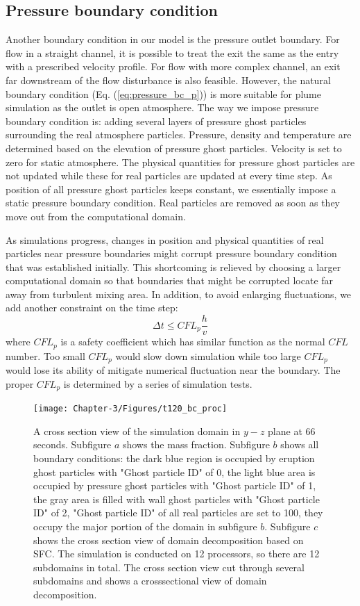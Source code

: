 \subsection{Pressure boundary condition}
Another boundary condition in our model is the pressure outlet boundary. For flow in a straight channel, it is possible to treat the exit the same as the entry with a prescribed velocity profile. For flow with more complex channel, an exit far downstream of the flow disturbance is also feasible. However, the natural boundary condition (Eq. (\ref{eq:pressure_bc_p})) is more suitable for plume simulation as the outlet is open atmosphere. The way we impose pressure boundary condition is: adding several layers of pressure ghost particles surrounding the real atmosphere particles. Pressure, density and temperature are determined based on the elevation of pressure ghost particles. Velocity is set to zero for static atmosphere. The physical quantities for pressure ghost particles are not updated while these for real particles are updated at every time step. As position of all pressure ghost particles keeps constant, we essentially impose a static pressure boundary condition. Real particles are removed as soon as they move out from the computational domain.

As simulations progress, changes in position and physical quantities of real particles near pressure boundaries might corrupt pressure boundary condition that was established initially. This shortcoming is relieved by choosing a larger computational domain so that boundaries that might be corrupted locate far away from turbulent mixing area. In addition, to avoid enlarging fluctuations, we add another constraint on the time step: 
\begin{equation}
\Delta t \leq CFL_p \dfrac{h}{v}
\end{equation}
where $CFL_p$ is a safety coefficient which has similar function as the normal $CFL$ number. Too small $CFL_p$ would slow down simulation while too large $CFL_p$ would lose its ability of mitigate numerical fluctuation near the boundary. The proper $CFL_p$ is determined by a series of simulation tests.

\begin{figure}
\center
\texttt{[image: Chapter-3/Figures/t120\_bc\_proc]}
\caption{A cross section view of the simulation domain in $y-z$ plane at 66 seconds. Subfigure $a$ shows the mass fraction. Subfigure $b$ shows all boundary conditions: the dark blue region is occupied by eruption ghost particles with "Ghost particle ID" of 0, the light blue area is occupied by pressure ghost particles with "Ghost particle ID" of 1, the gray area is filled with wall ghost particles with "Ghost particle ID" of 2, "Ghost particle ID" of all real particles are set to 100, they occupy the major portion of the domain in subfigure $b$. Subfigure $c$ shows the cross section view of domain decomposition based on SFC. The simulation is conducted on 12 processors, so there are 12 subdomains in total. The cross section view cut through several subdomains and shows a crosssectional view of domain decomposition.}
\label{fig:bc_and_domain_decomp}
\end{figure}